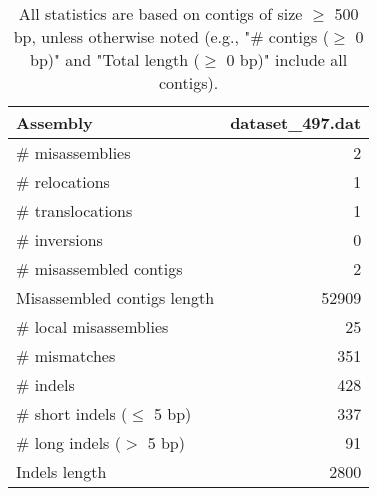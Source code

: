 \documentclass[12pt,a4paper]{article}
\begin{document}
\begin{table}[ht]
\begin{center}
\caption{All statistics are based on contigs of size $\geq$ 500 bp, unless otherwise noted (e.g., "\# contigs ($\geq$ 0 bp)" and "Total length ($\geq$ 0 bp)" include all contigs).}
\begin{tabular}{|l*{1}{|r}|}
\hline
Assembly & dataset\_497.dat \\ \hline
\# misassemblies & 2 \\ \hline
\hspace{5mm}\# relocations & 1 \\ \hline
\hspace{5mm}\# translocations & 1 \\ \hline
\hspace{5mm}\# inversions & 0 \\ \hline
\# misassembled contigs & 2 \\ \hline
Misassembled contigs length & 52909 \\ \hline
\# local misassemblies & 25 \\ \hline
\# mismatches & 351 \\ \hline
\# indels & 428 \\ \hline
\hspace{5mm}\# short indels ($\leq$ 5 bp) & 337 \\ \hline
\hspace{5mm}\# long indels ($>$ 5 bp) & 91 \\ \hline
Indels length & 2800 \\ \hline
\end{tabular}
\end{center}
\end{table}
\end{document}
